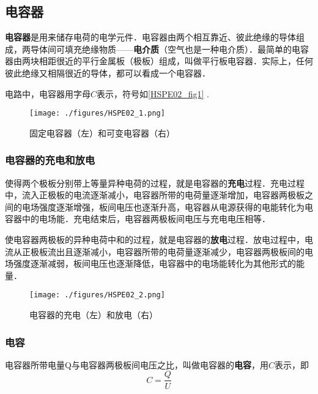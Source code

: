 
\begin{issues}
\issueDraft
\issueTODO
\end{issues}


\subsection{电容器}

\textbf{电容器}是用来储存电荷的电学元件．电容器由两个相互靠近、彼此绝缘的导体组成，两导体间可填充绝缘物质——\textbf{电介质}（空气也是一种电介质）．最简单的电容器由两块相距很近的平行金属板（极板）组成，叫做平行板电容器．实际上，任何彼此绝缘又相隔很近的导体，都可以看成一个电容器．

电路中，电容器用字母$C$表示，符号如\autoref{HSPE02_fig1} .

\begin{figure}[ht]
\centering
\texttt{[image: ./figures/HSPE02\_1.png]}
\caption{固定电容器（左）和可变电容器（右）} \label{HSPE02_fig1}
\end{figure}

\subsubsection{电容器的充电和放电}

使得两个极板分别带上等量异种电荷的过程，就是电容器的\textbf{充电}过程．充电过程中，流入正极板的电流逐渐减小，电容器所带的电荷量逐渐增加，电容器两极板之间的电场强度逐渐增强，板间电压也逐渐升高，电容器从电源获得的电能转化为电容器中的电场能．充电结束后，电容器两极板间电压与充电电压相等．

使电容器两极板的异种电荷中和的过程，就是电容器的\textbf{放电}过程．放电过程中，电流从正极板流出且逐渐减小，电容器所带的电荷量逐渐减少，电容器两极板间的电场强度逐渐减弱，板间电压也逐渐降低，电容器中的电场能转化为其他形式的能量．

\begin{figure}[ht]
\centering
\texttt{[image: ./figures/HSPE02\_2.png]}
\caption{电容器的充电（左）和放电（右）} \label{HSPE02_fig2}
\end{figure}

\subsubsection{电容}

电容器所带电量Q与电容器两极板间电压之比，叫做电容器的\textbf{电容}，用$C$表示，即
\begin{equation}
C=\frac{Q}{U}
\end{equation}

